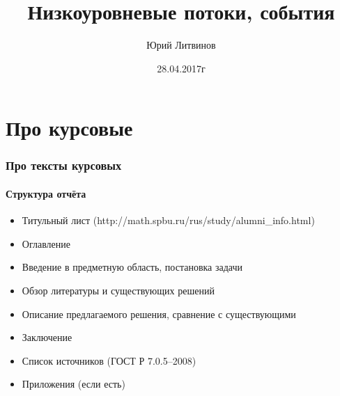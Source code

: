 \documentclass[xetex,mathserif,serif]{beamer}
\title{Низкоуровневые потоки, события}
\author{Юрий Литвинов}
\date{28.04.2017г}
\begin{document}
	\frame{\titlepage}

	\section{Про курсовые}

	\begin{frame}
		\frametitle{Про тексты курсовых}
		\framesubtitle{Структура отчёта}
		\begin{itemize}
			\item Титульный лист (http://math.spbu.ru/rus/study/alumni\_info.html)
			\item Оглавление
			\item Введение в предметную область, постановка задачи
			\item Обзор литературы и существующих решений
			\item Описание предлагаемого решения, сравнение с существующими
			\item Заключение
			\item Список источников (ГОСТ Р 7.0.5--2008)
			\item Приложения (если есть)
		\end{itemize}
	\end{frame}
\end{document}
